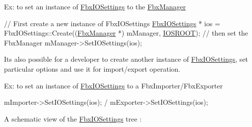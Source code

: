Ex\+: to set an instance of \hyperlink{class_fbx_i_o_settings}{Fbx\+I\+O\+Settings} to the \hyperlink{class_fbx_manager}{Fbx\+Manager}


\begin{DoxyCode}
\textcolor{comment}{// First create a new instance of FbxIOSettings}
\hyperlink{class_fbx_i_o_settings}{FbxIOSettings} * ios = FbxIOSettings::Create((\hyperlink{class_fbx_manager}{FbxManager} *) mManager, 
      \hyperlink{fbxiosettingspath_8h_a57a5e54b72d0f2936d5ee84d8f510a0a}{IOSROOT});
\textcolor{comment}{// then set the FbxManager}
mManager->SetIOSettings(ios);
\end{DoxyCode}


It\textquotesingle{}s also possible for a developer to create another instance of \hyperlink{class_fbx_i_o_settings}{Fbx\+I\+O\+Settings}, set particular options and use it for import/export operation.

Ex\+: to set an instance of \hyperlink{class_fbx_i_o_settings}{Fbx\+I\+O\+Settings} to a Fbx\+Importer/\+Fbx\+Exporter 
\begin{DoxyCode}
mImporter->SetIOSettings(ios); / mExporter->SetIOSettings(ios);
\end{DoxyCode}


A schematic view of the \hyperlink{class_fbx_i_o_settings}{Fbx\+I\+O\+Settings} tree \+:

